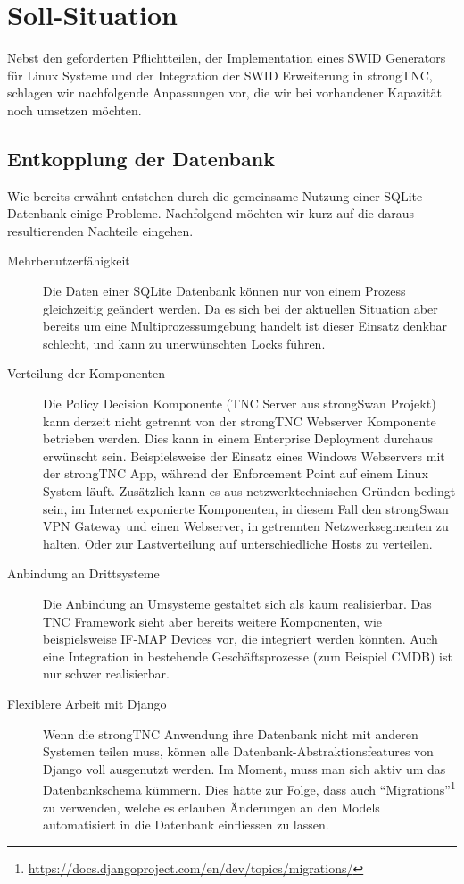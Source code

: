 \section{Soll-Situation}
\label{analyse:soll-situation}

Nebst den geforderten Pflichtteilen, der Implementation eines SWID Generators
für Linux Systeme und der Integration der SWID Erweiterung in strongTNC,
schlagen wir nachfolgende Anpassungen vor, die wir bei vorhandener Kapazität
noch umsetzen möchten.

\subsection{Entkopplung der Datenbank}
Wie bereits erwähnt entstehen durch die gemeinsame Nutzung einer SQLite
Datenbank einige Probleme. Nachfolgend möchten wir kurz auf die daraus
resultierenden Nachteile eingehen.

\begin{description}
	\item[Mehrbenutzerfähigkeit] Die Daten einer SQLite Datenbank können nur von
	einem Prozess gleichzeitig geändert werden. Da es sich bei der aktuellen
	Situation aber bereits um eine Multiprozessumgebung handelt ist dieser Einsatz
	denkbar schlecht, und kann zu unerwünschten Locks führen.

	\item[Verteilung der Komponenten] Die Policy Decision Komponente (TNC Server
	aus strongSwan Projekt) kann derzeit nicht getrennt von der strongTNC Webserver
	Komponente betrieben werden. Dies kann in einem Enterprise Deployment
	durchaus erwünscht sein. Beispielsweise der Einsatz eines Windows Webservers
	mit der strongTNC App, während der Enforcement Point auf einem Linux System
	läuft. Zusätzlich kann es aus netzwerktechnischen Gründen bedingt sein, im
	Internet exponierte Komponenten, in diesem Fall den strongSwan VPN Gateway und
	einen Webserver, in getrennten Netzwerksegmenten zu halten. Oder zur
	Lastverteilung auf unterschiedliche Hosts zu verteilen.

	\item[Anbindung an Drittsysteme] Die Anbindung an Umsysteme gestaltet sich als
	kaum realisierbar. Das TNC Framework sieht aber bereits weitere Komponenten,
	wie beispielsweise IF-MAP Devices vor, die integriert werden könnten. Auch eine
	Integration in bestehende Geschäftsprozesse (zum Beispiel CMDB) ist nur schwer realisierbar.
	
	\item[Flexiblere Arbeit mit Django] Wenn die strongTNC Anwendung ihre Datenbank
	nicht mit anderen Systemen teilen muss, können alle
	Datenbank-Abstraktionsfeatures von Django voll ausgenutzt werden. Im Moment,
	muss man sich aktiv um das Datenbankschema kümmern. Dies hätte zur Folge, dass
	auch
	\enquote{Migrations}\footnote{\url{https://docs.djangoproject.com/en/dev/topics/migrations/}} zu verwenden, welche es erlauben Änderungen an den Models automatisiert in die Datenbank einfliessen zu lassen.
	
\end{description} 


